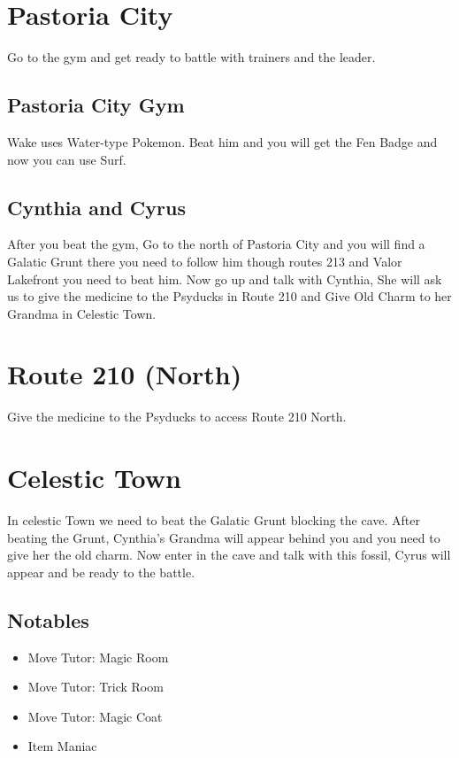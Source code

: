 \documentclass[11pt]{article}
\begin{document}



\section{Pastoria City}\label{sec:pastoria-city}
Go to the gym and get ready to battle with trainers and the leader.

\subsection{Pastoria City Gym}\label{subsec:pastoria-city-gym}
Wake uses Water-type Pokemon.
Beat him and you will get the Fen Badge and now you can use Surf.

\subsection{Cynthia and Cyrus}\label{subsec:cynthia-and-cyrus}
After you beat the gym, Go to the north of Pastoria City
and you will find a Galatic Grunt there you need to follow him though routes 213
and Valor Lakefront you need to beat him.
Now go up and talk with Cynthia, She will ask us to give the medicine to the
Psyducks in Route 210 and Give Old Charm to her Grandma in Celestic Town.

\section{Route 210 (North)}\label{sec:route-210-(north)}
Give the medicine to the Psyducks to access Route 210 North.

\section{Celestic Town}\label{sec:celestic-town}
In celestic Town we need to beat the Galatic Grunt blocking the cave.
After beating the Grunt, Cynthia's Grandma will appear behind you
and you need to give her the old charm.
Now enter in the cave and talk with this fossil, Cyrus will appear and be ready to the battle.

\subsection{Notables}\label{subsec:notables-celestic}

\begin{itemize}
    \item Move Tutor: Magic Room
    \item Move Tutor: Trick Room
    \item Move Tutor: Magic Coat
    \item Item Maniac
\end{itemize}
\end{document}
